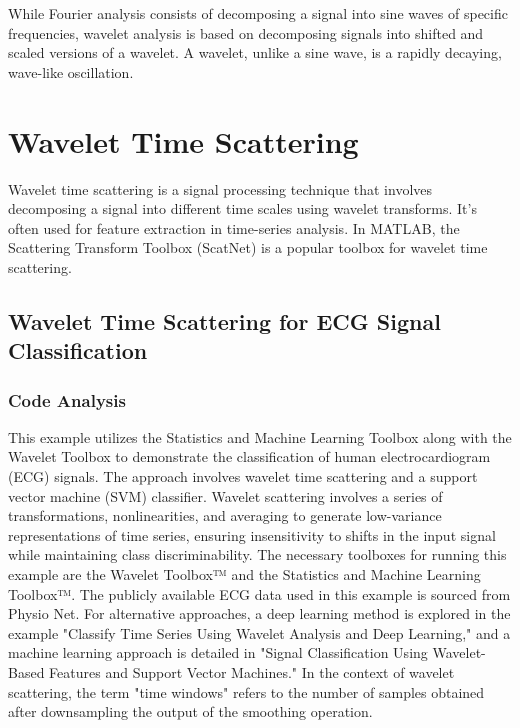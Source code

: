 \documentclass{article}
\begin{document}
While Fourier analysis consists of decomposing a signal into sine waves of specific frequencies, wavelet analysis is based on decomposing signals into shifted and scaled versions of a wavelet. A wavelet, unlike a sine wave, is a rapidly decaying, wave-like oscillation. 

\section{Wavelet Time Scattering} 
Wavelet time scattering is a signal processing technique that involves decomposing a signal into different time scales using wavelet transforms. It's often used for feature extraction in time-series analysis. In MATLAB, the Scattering Transform Toolbox (ScatNet) is a popular toolbox for wavelet time scattering.


\subsection{Wavelet Time Scattering for ECG Signal Classification} 
\subsubsection{Code Analysis} 
This example utilizes the Statistics and Machine Learning Toolbox along with the Wavelet Toolbox to demonstrate the classification of human electrocardiogram (ECG) signals. The approach involves wavelet time scattering and a support vector machine (SVM) classifier. Wavelet scattering involves a series of transformations, nonlinearities, and averaging to generate low-variance representations of time series, ensuring insensitivity to shifts in the input signal while maintaining class discriminability. The necessary toolboxes for running this example are the Wavelet Toolbox™ and the Statistics and Machine Learning Toolbox™. The publicly available ECG data used in this example is sourced from Physio Net. For alternative approaches, a deep learning method is explored in the example "Classify Time Series Using Wavelet Analysis and Deep Learning," and a machine learning approach is detailed in "Signal Classification Using Wavelet-Based Features and Support Vector Machines." In the context of wavelet scattering, the term "time windows" refers to the number of samples obtained after downsampling the output of the smoothing operation. 
\end{document}
